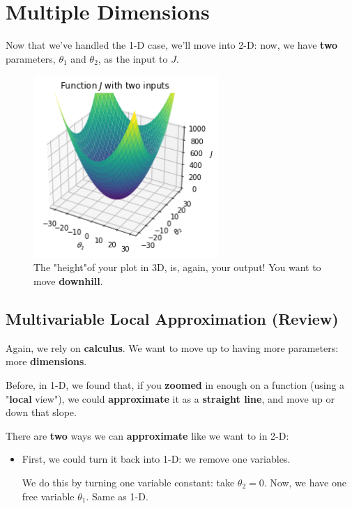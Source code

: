 \section*{Multiple Dimensions}

    Now that we've handled the 1-D case, we'll move into 2-D: now, we have \textbf{two} parameters, $\theta_1$ and $\theta_2$, as the input to $J$.
    
    \begin{figure}[H]
        \centering
            \includegraphics[width=70mm,scale=0.5]{images/gradient_descent_images/3dplot.png}
        
        \caption*{The "height"of your plot in 3D, is, again, your output! You want to move \textbf{downhill}.}
    \end{figure}
        
    \subsection*{Multivariable Local Approximation (Review)}
    
        Again, we rely on \textbf{calculus}. We want to move up to having more parameters: more \textbf{dimensions}. 
        
        Before, in 1-D, we found that, if you \textbf{zoomed} in enough on a function (using a "\textbf{local} view"), we could \textbf{approximate} it as a \textbf{straight line}, and move up or down that slope.
        
        There are \textbf{two} ways we can \textbf{approximate} like we want to in 2-D:
        
        \begin{itemize}
            \item First, we could turn it back into 1-D: we remove one variables.
            
            We do this by turning one variable constant: take $\theta_2=0$. Now, we have one free variable $\theta_1$. Same as 1-D.\\
        \end{itemize}
        

